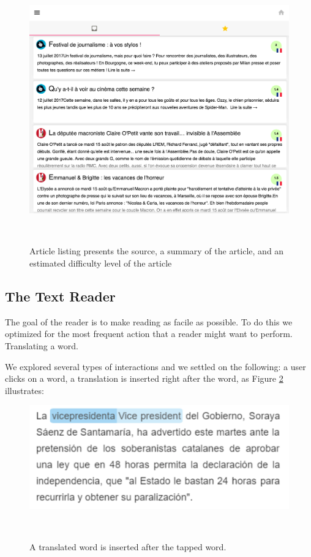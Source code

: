 
\begin{figure}[h!]
\centering
  \includegraphics[width=0.95\columnwidth]{figures/article_listing}
  \caption{Article listing presents the source, a summary of the article, and an estimated difficulty level of the article }~\label{fig:registrations}
\end{figure}


\subsection{The Text Reader}

The goal of the reader is to make reading as facile as possible. To do this we optimized for the most frequent action that a reader might want to perform. Translating a word. 

We explored several types of interactions and we settled on the following: a user clicks on a word, a translation is inserted right after the word, as Figure \ref{fig:translated_word} illustrates: 

\begin{figure}[h!]
\centering
  \includegraphics[width=0.8\columnwidth]{figures/translated_word}
  \caption{A translated word is inserted after the tapped word.}~\label{fig:translated_word}
\end{figure}

